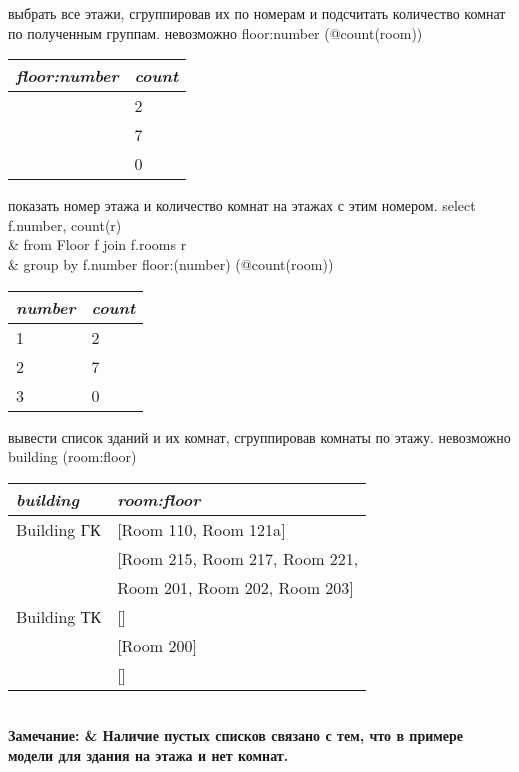 \exastable
    {выбрать все этажи, сгруппировав их по номерам и подсчитать количество комнат по полученным группам.}
    {невозможно}
    {floor:number (@count(room))}
    {\begin{tabular}{|l|l|}
	\hline
	\it{floor:number} & \it{count}\\[5pt]
	\hline
	\hline
	[Floor 1, Floor 1] & 2 \\
	\hline
	[Floor 2, Floor 2] & 7 \\
	\hline
	[Floor 3] & 0 \\
	\hline
    \end{tabular}}

\exastable
    {показать номер этажа и количество комнат на этажах с этим номером.}
    {select f.number, count(r) \\
    & \hspace{0.4cm} from Floor f join f.rooms r \\
    & \hspace{0.4cm} group by f.number}
    {floor:(number) (@count(room))}
    {\begin{tabular}{|l|l|}
	\hline
	\it{number} & \it{count}\\[5pt]
	\hline
	\hline
	1 & 2 \\
	\hline
	2 & 7 \\
	\hline
	3 & 0 \\
	\hline
    \end{tabular}}

\exastable
    {вывести список зданий и их комнат, сгруппировав комнаты по этажу.}
    {невозможно}
    {building (room:floor)}
    {\begin{tabular}{|l|l|}
	\hline
	\it{building} & \it{room:floor}\\[5pt]
	\hline
	\hline
	Building ГК & [Room 110, Room 121a] \\
	\cline{2-2}
		    & [Room 215, Room 217, Room 221, \\
		    & Room 201, Room 202, Room 203] \\
	\hline
	Building ТК & [] \\
	\cline{2-2}
		    & [Room 200] \\
	\cline{2-2}
		    & [] \\
	\hline
    \end{tabular}\\
    \bf{Замечание:} & Наличие пустых списков связано с тем, что в примере модели для здания 
	на этажа  и  нет комнат.
    }





